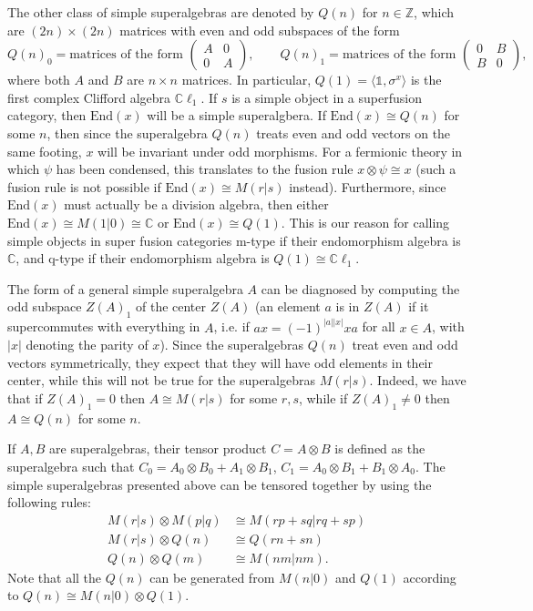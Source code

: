 \documentclass[12pt,a4paper]{article}
\newcommand{\tp}{\otimes}
\newcommand{\unit}{\mathds{1}}
\newcommand{\zz}{\mathbb{Z}}
\newcommand{\cc}{\mathbb{C}}
\newcommand\be            {\begin{equation}}
\newcommand\ee            {\end{equation}}
\newcommand{\End}{\text{End}}
\newcommand{\cl}{\mathbb{C}\ell}
\begin{document}
The other class of simple superalgebras are denoted by $Q(n)$ for $n\in \zz$, which are $(2n)\times(2n)$ matrices with even and odd subspaces of the form
\be Q(n)_0 = \text{matrices of the form\ } \begin{pmatrix} A & 0 \\ 0 & A \end{pmatrix},\qquad Q(n)_1 = \text{matrices of the form\ } \begin{pmatrix} 0 & B \\ B & 0 \end{pmatrix},\ee
where both $A$ and $B$ are $n\times n$ matrices. In particular, $Q(1) = \langle \unit, \sigma^x\rangle$ is the first complex Clifford algebra $\cl_1$. 
If $s$ is a simple object in a superfusion category, then $\End(x)$ will be a simple superalgbera. If $\End(x)\cong Q(n)$ for some $n$, then since the superalgebra $Q(n)$ treats even and odd vectors 
on the same footing, $x$ will be invariant under odd morphisms. 
For a fermionic theory in which $\psi$ has been condensed, this translates to the fusion rule $x\tp\psi \cong x$ (such a fusion rule is not possible if $\End(x)\cong M(r|s)$ instead). 
Furthermore, since $\End(x)$ must actually be a division algebra, then either $\End(x) \cong M(1|0) \cong \cc$ or $\End(x) \cong Q(1)$. 
This is our reason for calling simple objects in super fusion categories m-type if their endomorphism algebra is $\cc$, and q-type if their endomorphism algebra is $Q(1)\cong\cl_1$. 

The form of a general simple superalgebra $A$ can be diagnosed by computing the odd subspace $Z(A)_1$ of the center $Z(A)$ (an element $a$ is in $Z(A)$ if it supercommutes with everything in $A$, i.e. if $ax = (-1)^{|a||x|}xa$ for all $x\in A$, with $|x|$ denoting the parity of $x$).
Since the superalgebras $Q(n)$ treat even and odd vectors symmetrically, they expect that they will have odd elements in their center, while this will not be true for the superalgebras $M(r|s)$. 
Indeed, we have that if $Z(A)_1 = 0$ then $A \cong M(r|s)$ for some $r,s$, while if $Z(A)_1 \neq 0$ then $A\cong Q(n)$ for some $n$. 

If $A,B$ are superalgebras, their tensor product $C=A\tp B$ is defined as the superalgebra such that $C_0 = A_0\tp B_0 + A_1\tp B_1$, $C_1 = A_0\tp B_1 + B_1\tp A_0$. 
The simple superalgebras presented above can be tensored together by using the following rules:
\be \begin{aligned} M(r|s) \tp M(p|q) & \cong M(rp+sq|rq+sp) \\ 
M(r|s) \tp Q(n) & \cong Q(rn+sn) \\ 
Q(n) \tp Q(m) & \cong M(nm | nm). \end{aligned}
\ee
Note that all the $Q(n)$ can be generated from $M(n|0)$ and $Q(1)$ according to $Q(n) \cong M(n|0)\tp Q(1)$. 
\end{document}
